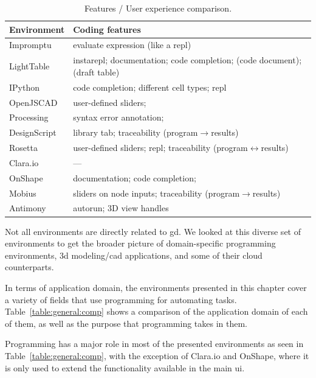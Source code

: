 \begin{table}
	\centering
	\renewcommand{\arraystretch}{1.2}

	\begin{tabulary}{\textwidth}{lL}
		\toprule
		{\bf Environment} & {\bf Coding features} \\
		\midrule
		Impromptu			& evaluate expression	(like a \gls{repl})																					\\
		LightTable		& instarepl; documentation; code completion; (code document); (draft table) 			\\
		IPython				& code completion; different cell types; \gls{repl}																\\
		OpenJSCAD			& user-defined sliders;																														\\
		Processing		& syntax error annotation;																												\\
		DesignScript	& library tab; traceability (program$\rightarrow$results)													\\
		Rosetta				& user-defined sliders; \gls{repl}; traceability (program$\leftrightarrow$results)\\
		Clara.io			& ---																																							\\
		OnShape				& documentation; code completion; 																								\\
		Mobius				& sliders on node inputs; traceability (program$\rightarrow$results)							\\
		Antimony			& autorun; 3D view handles																												\\
		\bottomrule
	\end{tabulary}

	\caption{Features / User experience comparison.}
	\label{table:features:comp}
\end{table}

Not all environments are directly related to \gls{gd}. We looked at this diverse set of environments to get the broader picture of domain-specific programming environments, 3d modeling/\gls{cad} applications, and some of their cloud counterparts.

In terms of application domain, the environments presented in this chapter cover a variety of fields that use programming for automating tasks.
Table~\ref{table:general:comp} shows a comparison of the application domain of each of them, as well as the purpose that programming takes in them.

Programming has a major role in most of the presented environments as seen in Table~\ref{table:general:comp}, with the exception of Clara.io and OnShape, where it is only used to extend the functionality available in the main \gls{ui}.

